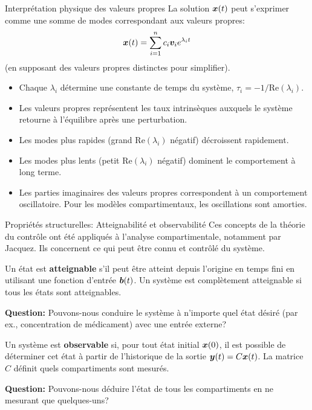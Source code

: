 \documentclass[aspectratio=169]{beamer}\usepackage[]{graphicx}\usepackage[]{xcolor}
\begin{document}
\begin{frame}{Interprétation physique des valeurs propres}
    La solution $\bm{x}(t)$ peut s'exprimer comme une somme de modes correspondant aux valeurs propres:
    $$ \bm{x}(t) = \sum_{i=1}^n c_i \bm{v}_i e^{\lambda_i t} $$
    (en supposant des valeurs propres distinctes pour simplifier).
    \begin{itemize}
        \item Chaque $\lambda_i$ détermine une constante de temps du système, $\tau_i = -1/\text{Re}(\lambda_i)$.
        \item Les valeurs propres représentent les taux intrinsèques auxquels le système retourne à l'équilibre après une perturbation.
        \item Les modes plus rapides (grand $\text{Re}(\lambda_i)$ négatif) décroissent rapidement.
        \item Les modes plus lents (petit $\text{Re}(\lambda_i)$ négatif) dominent le comportement à long terme.
        \item Les parties imaginaires des valeurs propres correspondent à un comportement oscillatoire. Pour les modèles compartimentaux, les oscillations sont amorties.
    \end{itemize}
\end{frame}

\begin{frame}{Propriétés structurelles: Atteignabilité et observabilité}
    Ces concepts de la théorie du contrôle ont été appliqués à l'analyse compartimentale, notamment par Jacquez. Ils concernent ce qui peut être connu et contrôlé du système.

    \begin{definition}[Atteignabilité]
        Un état est \textbf{atteignable} s'il peut être atteint depuis l'origine en temps fini en utilisant une fonction d'entrée $\bm{b}(t)$. Un système est complètement atteignable si tous les états sont atteignables.
    \end{definition}
    \textbf{Question:} Pouvons-nous conduire le système à n'importe quel état désiré (par ex., concentration de médicament) avec une entrée externe?

    \begin{definition}[Observabilité]
        Un système est \textbf{observable} si, pour tout état initial $\bm{x}(0)$, il est possible de déterminer cet état à partir de l'historique de la sortie $\bm{y}(t) = C\bm{x}(t)$. La matrice $C$ définit quels compartiments sont mesurés.
    \end{definition}
    \textbf{Question:} Pouvons-nous déduire l'état de tous les compartiments en ne mesurant que quelques-uns?
\end{frame}
\end{document}
